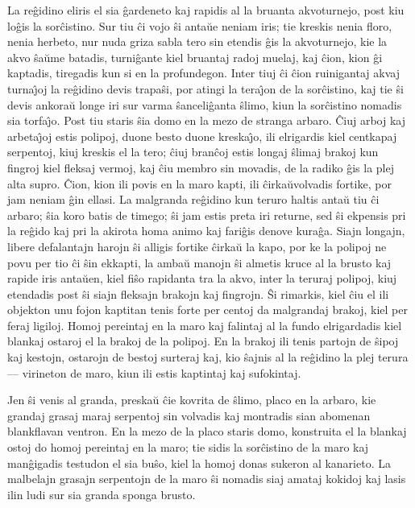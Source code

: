    La re\^gidino eliris el sia \^gardeneto kaj rapidis al la bruanta
akvoturnejo, post kiu lo\^gis la sor\^cistino. Sur tiu \^ci vojo
\^si anta\u ue neniam iris; tie kreskis nenia floro, nenia herbeto,
nur nuda griza sabla tero sin etendis \^gis la akvoturnejo, kie la
akvo \^sa\u ume batadis, turni\^gante kiel bruantaj radoj muelaj,
kaj \^cion, kion \^gi kaptadis, tiregadis kun si en la profundegon.
Inter tiuj \^ci \^cion ruinigantaj akvaj turna\^{\j}oj la re\^gidino
devis trapa\^si, por atingi la tera\^{\j}on de la sor\^cistino, kaj
tie \^si devis ankora\u u longe iri sur varma \^sanceli\^ganta
\^slimo, kiun la sor\^cistino nomadis sia torfa\^{\j}o. Post tiu
staris \^sia domo en la mezo de stranga arbaro. \^Ciuj arboj kaj
arbeta\^{\j}oj estis polipoj, duone besto duone kreska\^{\j}o, ili
elrigardis kiel centkapaj serpentoj, kiuj kreskis el la tero; \^ciuj
bran\^coj estis longaj \^slimaj brakoj kun fingroj kiel fleksaj
vermoj, kaj \^ciu membro sin movadis, de la radiko \^gis la plej
alta supro. \^Cion, kion ili povis en la maro kapti, ili \^cirka\u
uvolvadis fortike, por jam neniam \^gin ellasi. La malgranda
re\^gidino kun teruro haltis anta\u u tiu \^ci arbaro; \^sia koro
batis de timego; \^si jam estis preta iri returne, sed \^si ekpensis
pri la re\^gido kaj pri la akirota homa animo kaj fari\^gis denove
kura\^ga. Siajn longajn, libere defalantajn harojn \^si alligis
fortike \^cirka\u u la kapo, por ke la polipoj ne povu per tio \^ci
\^sin ekkapti, la amba\u u manojn \^si almetis kruce al la brusto
kaj rapide iris anta\u uen, kiel fi\^so rapidanta tra la akvo, inter
la teruraj polipoj, kiuj etendadis post \^si siajn fleksajn brakojn
kaj fingrojn. \^Si rimarkis, kiel \^ciu el ili objekton unu fojon
kaptitan tenis forte per centoj da malgrandaj brakoj, kiel per feraj
ligiloj. Homoj pereintaj en la maro kaj falintaj al la fundo
elrigardadis kiel blankaj ostaroj el la brakoj de la polipoj. En la
brakoj ili tenis partojn de \^sipoj kaj kestojn, ostarojn de bestoj
surteraj kaj, kio \^sajnis al la re\^gidino la plej terura
--- virineton de maro, kiun ili estis kaptintaj kaj sufokintaj.

   Jen \^si venis al granda, preska\u u \^cie kovrita de \^slimo, placo en la
arbaro, kie grandaj grasaj maraj serpentoj sin volvadis kaj
montradis sian abomenan blankflavan ventron. En la mezo de la placo
staris domo, konstruita el la blankaj ostoj do homoj pereintaj en la
maro; tie sidis la sor\^cistino de la maro kaj man\^gigadis testudon
el sia bu\^so, kiel la homoj donas sukeron al kanarieto. La
malbelajn grasajn serpentojn de la maro \^si nomadis siaj amataj
kokidoj kaj lasis ilin ludi sur sia granda sponga brusto.

